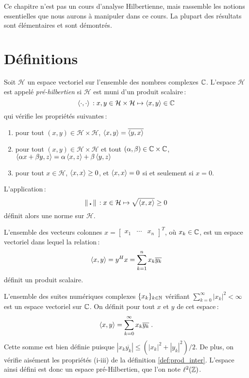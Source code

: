 Ce chapitre n'est pas un cours d'analyse Hilbertienne, mais
rassemble les notions essentielles que nous aurons \`{a} manipuler dans ce
cours. La plupart des r\'{e}sultats sont \'{e}l\'{e}mentaires et sont d\'{e}montr\'{e}s.
\section{D\'{e}finitions}
\begin{definition}
\label{def:prod_inter} Soit $\mathcal{H}$ un espace vectoriel sur
l'ensemble des nombres complexes $\mathbb{C}$. L'espace $\mathcal{H}$
est appel\'{e} \emph{pr\'{e}-hilbertien} si $\mathcal{H}$ est muni d'un
produit scalaire\,:
$$
 \left\langle \cdot, \cdot \right\rangle\, : x,y\in \mathcal{H} \times \mathcal{H}
 \mapsto \left\langle x, y \right\rangle\in \mathbb{C}
$$
qui v\'{e}rifie les propri\'{e}t\'{e}s suivantes\,:
\begin{enumerate}[label=\emph{\alph*})]
\item pour tout $(x,y) \in \mathcal{H} \times \mathcal{H}$,
  $\left\langle x, y \right\rangle=\overline{\left\langle y, x \right\rangle}$
   \item pour tout $(x,y) \in \mathcal{H} \times \mathcal{H}$ et tout $(\alpha,\beta) \in \mathbb{C} \times \mathbb{C}$,
$\left\langle \alpha x+ \beta y, z \right\rangle= \alpha \left\langle x, z \right\rangle+ \beta \left\langle y, z \right\rangle$
   \item pour tout $x \in \mathcal{H}$, $\left\langle x, x \right\rangle\geq 0$, et $\left\langle x, x \right\rangle=0$ si et seulement si $x=0$.
\end{enumerate}
L'application\,:
\[
\| \centerdot \|\, : x\in\mathcal{H}
  \mapsto \sqrt{\left\langle x, x \right\rangle} \geq 0
\]
d\'{e}finit alors une norme sur $\mathcal{H}$.
\end{definition}
\begin{example}
L'ensemble des vecteurs colonnes
$x=[\begin{matrix}x_1&\cdots&x_n\end{matrix}]^T$, o\`{u} $x_k\in
\mathbb{C}$, est un espace vectoriel dans lequel la relation\,:
$$
\left\langle x, y \right\rangle=y^Hx=\sum_{k=1}^n x_k\overline{y_k}
$$
d\'{e}finit un produit scalaire.
\end{example}
\begin{example}
L'ensemble des suites num\'{e}riques complexes $\{ x_k \}_{k \in
\mathbb{N}}$ v\'{e}rifiant $\sum_{k = 0}^\infty |x_k|^2 < \infty$
est un espace vectoriel sur $\mathbb{C}$. On d\'{e}finit pour tout $x$ et $y$ de cet
espace\,:
\[
\left\langle x, y \right\rangle = \sum_{k=0}^\infty {x}_k\overline{y_k}
   \;.
\]
Cette somme est bien d\'{e}finie puisque $|{x}_k\overline{y_k}|\leq(|x_k|^2+|y_k|^2)/2$.
De plus, on v\'{e}rifie ais\'{e}ment les propri\'{e}t\'{e}s (i-iii) de la d\'{e}finition
\ref{def:prod_inter}. L'espace ainsi d\'{e}fini est donc un espace
pr\'{e}-Hilbertien, que l'on note $\ell^2(\mathbb{Z})$.
\end{example}
